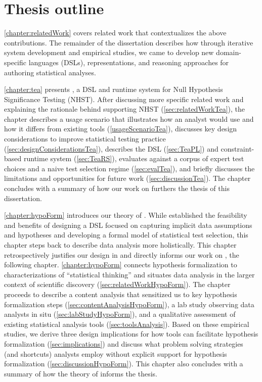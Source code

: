 
\section{Thesis outline}
\autoref{chapter:relatedWork} covers related work that contextualizes the above
contributions. The remainder of the dissertation describes how through iterative
system development and empirical studies, we came to develop new domain-specific
languages (DSLs), representations, and reasoning approaches for authoring
statistical analyses.

\autoref{chapter:tea} presents \tea, a DSL and runtime system for Null
Hypothesis Significance Testing (NHST). After discussing more specific related work and
explaining the rationale behind supporting NHST (\autoref{sec:relatedWorkTea}), the chapter describes a
usage scenario that illustrates how an analyst would use \tea and how it differs
from existing tools (\autoref{usageScenarioTea}), discusses key design
considerations to improve statistical testing practice
(\autoref{sec:designConsiderationsTea}), describes the DSL (\autoref{sec:TeaPL})
and constraint-based runtime system (\autoref{sec:TeaRS}), evaluates \tea
against a corpus of expert test choices and a naive test selection regime
(\autoref{sec:evalTea}), and briefly discusses the limitations and opportunities
for future work (\autoref{sec:discussionTea}). The chapter concludes with a
summary of how our work on \tea furthers the thesis of this dissertation. 

\autoref{chapter:hypoForm} introduces our theory of \hypoForm. While \tea
established the feasibility and benefits of designing a DSL focused on capturing
implicit data assumptions and hypotheses and developing a formal model of
statistical test selection, this
chapter steps back to describe data analysis more holistically. This
chapter retrospectively justifies our design in \tea and directly informs our
work on \tisane, the following chapter. \autoref{chapter:hypoForm} connects hypothesis formalization to characterizations of ``statistical
thinking'' and situates data analysis in the larger context of scientific
discovery (\autoref{sec:relatedWorkHypoForm}). The chapter proceeds to
describe a content analysis that sensitized us to key hypothesis formalization
steps (\autoref{sec:contentAnalysisHypoForm}), a lab study observing data
analysts in situ (\autoref{sec:labStudyHypoForm}), and a qualitative assessment
of existing statistical analysis tools (\autoref{sec:toolsAnalysis}). Based on
these empirical studies, we derive three design implications for how tools can
facilitate hypothesis formalization (\autoref{sec:implications}) and discuss
what problem solving strategies (and shortcuts) analysts employ without explicit
support for hypothesis formalization (\autoref{sec:discussionHypoForm}). This
chapter also concludes with a summary of how the theory of \hypoForm informs the
thesis. 

